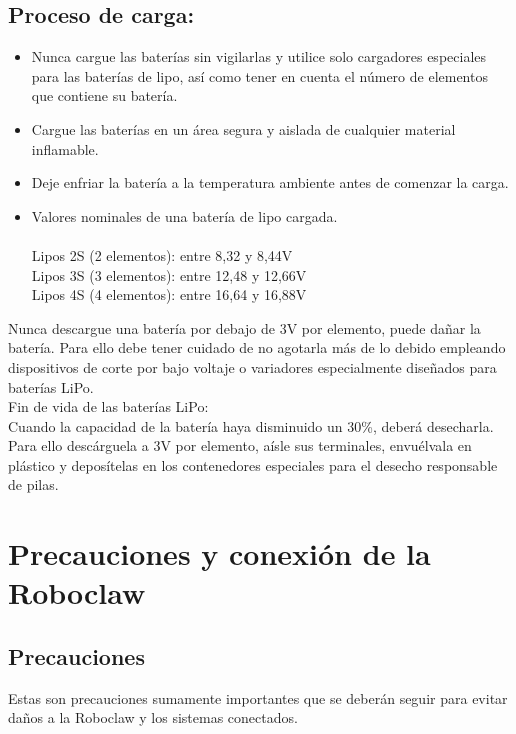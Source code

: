 \documentclass[user_manual.tex]{subfiles}
\begin{document}
\subsection{Proceso de carga:}
\begin{itemize}
 \item  Nunca cargue las baterías sin vigilarlas y utilice solo cargadores especiales para las baterías de lipo, así como tener
    en cuenta el número de elementos que contiene su batería.
 \item Cargue las baterías en un área segura y aislada de cualquier material inflamable.
 \item Deje enfriar la batería a la temperatura ambiente antes de comenzar la carga.
 \item Valores nominales de una batería de lipo cargada.\\
 \\
    Lipos 2S (2 elementos): entre 8,32 y 8,44V\\
    Lipos 3S (3 elementos): entre 12,48 y 12,66V\\
    Lipos 4S (4 elementos): entre 16,64 y 16,88V\\
\end{itemize}   

Nunca descargue una batería por debajo de 3V por elemento, puede dañar la batería. Para ello debe tener cuidado de no 
agotarla más de lo debido empleando dispositivos de corte por bajo voltaje o variadores especialmente diseñados para 
baterías LiPo.\\

Fin de vida de las baterías LiPo:\\

Cuando la capacidad de la batería haya disminuido un 30\%, deberá desecharla. Para ello descárguela a 3V por elemento, 
aísle sus terminales, envuélvala en plástico y deposítelas en los contenedores especiales para el desecho responsable de 
pilas.\\

\section{Precauciones y conexión de la Roboclaw}

\subsection{Precauciones}
Estas son precauciones sumamente importantes que se deberán seguir para evitar daños a la Roboclaw y los sistemas conectados.\\
\end{document}
